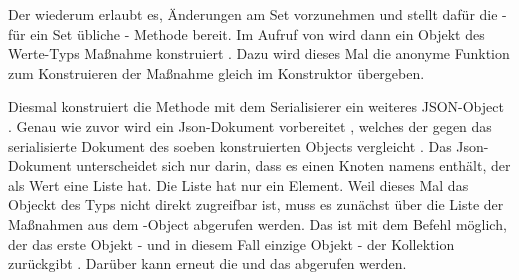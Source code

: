 Der  wiederum erlaubt es, Änderungen am Set vorzunehmen und stellt dafür die - für ein Set übliche - Methode  bereit. Im Aufruf von  wird dann ein Objekt des Werte-Typs Maßnahme konstruiert . Dazu wird dieses Mal die anonyme Funktion zum Konstruieren der Maßnahme gleich im Konstruktor übergeben. 


Diesmal konstruiert die Methode  mit dem Serialisierer  ein weiteres JSON-Object . Genau wie zuvor wird ein Json-Dokument vorbereitet , welches der   gegen das serialisierte Dokument des soeben konstruierten Objects  vergleicht . Das Json-Dokument unterscheidet sich nur darin, dass es einen Knoten namens  enthält, der als Wert eine Liste hat. Die Liste hat nur ein Element.  Weil dieses Mal das Objeckt des Typs  nicht direkt zugreifbar ist, muss es zunächst über die Liste der Maßnahmen aus dem -Object abgerufen werden. Das ist mit dem Befehl  möglich, der das erste Objekt - und in diesem Fall einzige Objekt - der Kollektion zurückgibt . Darüber kann erneut die   und  das  abgerufen werden.

